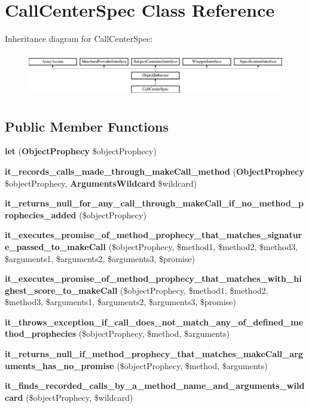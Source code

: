 \section{Call\+Center\+Spec Class Reference}
\label{classspec_1_1_prophecy_1_1_call_1_1_call_center_spec}
Inheritance diagram for Call\+Center\+Spec\+:\begin{figure}[H]
\begin{center}
\leavevmode
\includegraphics[height=1.953488cm]{classspec_1_1_prophecy_1_1_call_1_1_call_center_spec}
\end{center}
\end{figure}
\subsection*{Public Member Functions}
\begin{DoxyCompactItemize}
\item 
{\bf let} ({\bf Object\+Prophecy} \$object\+Prophecy)
\item 
{\bf it\+\_\+records\+\_\+calls\+\_\+made\+\_\+through\+\_\+make\+Call\+\_\+method} ({\bf Object\+Prophecy} \$object\+Prophecy, {\bf Arguments\+Wildcard} \$wildcard)
\item 
{\bf it\+\_\+returns\+\_\+null\+\_\+for\+\_\+any\+\_\+call\+\_\+through\+\_\+make\+Call\+\_\+if\+\_\+no\+\_\+method\+\_\+prophecies\+\_\+added} (\$object\+Prophecy)
\item 
{\bf it\+\_\+executes\+\_\+promise\+\_\+of\+\_\+method\+\_\+prophecy\+\_\+that\+\_\+matches\+\_\+signature\+\_\+passed\+\_\+to\+\_\+make\+Call} (\$object\+Prophecy, \$method1, \$method2, \$method3, \$arguments1, \$arguments2, \$arguments3, \$promise)
\item 
{\bf it\+\_\+executes\+\_\+promise\+\_\+of\+\_\+method\+\_\+prophecy\+\_\+that\+\_\+matches\+\_\+with\+\_\+highest\+\_\+score\+\_\+to\+\_\+make\+Call} (\$object\+Prophecy, \$method1, \$method2, \$method3, \$arguments1, \$arguments2, \$arguments3, \$promise)
\item 
{\bf it\+\_\+throws\+\_\+exception\+\_\+if\+\_\+call\+\_\+does\+\_\+not\+\_\+match\+\_\+any\+\_\+of\+\_\+defined\+\_\+method\+\_\+prophecies} (\$object\+Prophecy, \$method, \$arguments)
\item 
{\bf it\+\_\+returns\+\_\+null\+\_\+if\+\_\+method\+\_\+prophecy\+\_\+that\+\_\+matches\+\_\+make\+Call\+\_\+arguments\+\_\+has\+\_\+no\+\_\+promise} (\$object\+Prophecy, \$method, \$arguments)
\item 
{\bf it\+\_\+finds\+\_\+recorded\+\_\+calls\+\_\+by\+\_\+a\+\_\+method\+\_\+name\+\_\+and\+\_\+arguments\+\_\+wildcard} (\$object\+Prophecy, \$wildcard)
\end{DoxyCompactItemize}
